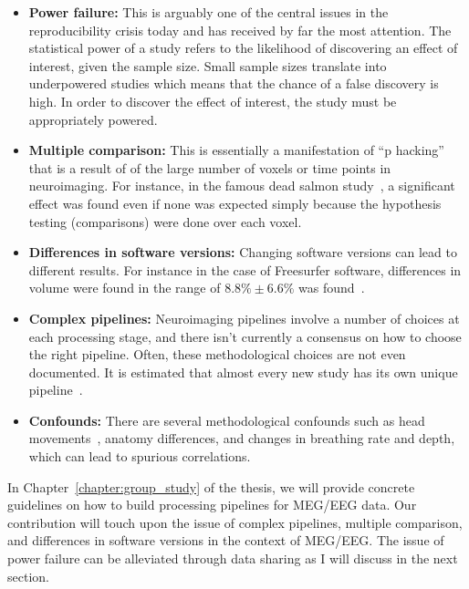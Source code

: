 \begin{itemize}[noitemsep,partopsep=0pt]
\item \textbf{Power failure:} This is arguably one of the central issues in the reproducibility crisis today and has received by far the most attention. The statistical power of a study refers to the likelihood of discovering an effect of interest, given the sample size. Small sample sizes translate into underpowered studies which means that the chance of a false discovery is high. In order to discover the effect of interest, the study must be appropriately powered.
\item \textbf{Multiple comparison:} This is essentially a manifestation of ``p hacking'' that is a result of of the large number of voxels or time points in neuroimaging. For instance, in the famous dead salmon study~\citep{bennett2009neural}, a significant effect was found even if none was expected simply because the hypothesis testing (comparisons) were done over each voxel.
\item \textbf{Differences in software versions:} Changing software versions can lead to different results. For instance in the case of Freesurfer software, differences in volume were found in the range of $8.8\% \pm 6.6\%$ was found~\citep{gronenschild2012effects}.
\item \textbf{Complex pipelines:} Neuroimaging pipelines involve a number of choices at each processing stage, and there isn't currently a consensus on how to choose the right pipeline. Often, these methodological choices are not even documented. It is estimated that almost every new study has its own unique pipeline~\citep{Carp2012289}.
\item \textbf{Confounds:} There are several methodological confounds such as head movements~\citep{yendiki2014spurious}, anatomy differences, and changes in breathing rate and depth, which can lead to spurious correlations.
\end{itemize}

In Chapter~\ref{chapter:group_study} of the thesis, we will provide concrete guidelines on how to build processing pipelines for \ac{MEG}/\ac{EEG} data. Our contribution will touch upon the issue of complex pipelines, multiple comparison, and differences in software versions in the context of \ac{MEG}/\ac{EEG}. The issue of power failure can be alleviated through data sharing as I will discuss in the next section.

